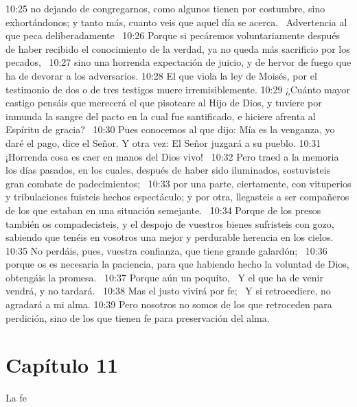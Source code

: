 10:25 no dejando de congregarnos, como algunos tienen por costumbre, sino exhortándonos; y tanto más, cuanto veis que aquel día se acerca.  
Advertencia al que peca deliberadamente  
10:26 Porque si pecáremos voluntariamente después de haber recibido el conocimiento de la verdad, ya no queda más sacrificio por los pecados,  
10:27 sino una horrenda expectación de juicio, y de hervor de fuego que ha de devorar a los adversarios. 
10:28 El que viola la ley de Moisés, por el testimonio de dos o de tres testigos muere irremisiblemente. 
10:29 ¿Cuánto mayor castigo pensáis que merecerá el que pisoteare al Hijo de Dios, y tuviere por inmunda la sangre del pacto en la cual fue santificado, e hiciere afrenta al Espíritu de gracia?  
10:30 Pues conocemos al que dijo: Mía es la venganza, yo daré el pago, dice el Señor. Y otra vez: El Señor juzgará a su pueblo. 
10:31 ¡Horrenda cosa es caer en manos del Dios vivo!  
10:32 Pero traed a la memoria los días pasados, en los cuales, después de haber sido iluminados, sostuvisteis gran combate de padecimientos;  
10:33 por una parte, ciertamente, con vituperios y tribulaciones fuisteis hechos espectáculo; y por otra, llegasteis a ser compañeros de los que estaban en una situación semejante.  
10:34 Porque de los presos también os compadecisteis, y el despojo de vuestros bienes sufristeis con gozo, sabiendo que tenéis en vosotros una mejor y perdurable herencia en los cielos.  
10:35 No perdáis, pues, vuestra confianza, que tiene grande galardón;  
10:36 porque os es necesaria la paciencia, para que habiendo hecho la voluntad de Dios, obtengáis la promesa.  
10:37 Porque aún un poquito,  
Y el que ha de venir vendrá, y no tardará.  
10:38 Mas el justo vivirá por fe;  
Y si retrocediere, no agradará a mi alma. 
10:39 Pero nosotros no somos de los que retroceden para perdición, sino de los que tienen fe para preservación del alma.  
\section*{Capítulo 11 }
La fe  


